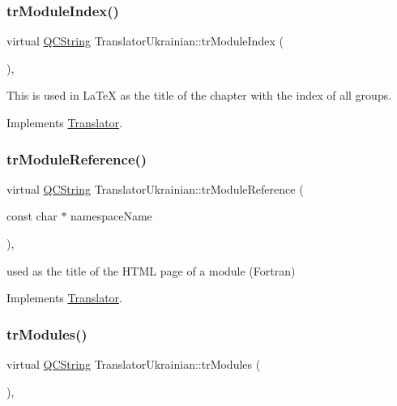 \subsubsection{\texorpdfstring{trModuleIndex()}{trModuleIndex()}}
{\footnotesize\ttfamily virtual \mbox{\hyperlink{class_q_c_string}{Q\+C\+String}} Translator\+Ukrainian\+::tr\+Module\+Index (\begin{DoxyParamCaption}{ }\end{DoxyParamCaption})\hspace{0.3cm}{\ttfamily [inline]}, {\ttfamily [virtual]}}

This is used in La\+TeX as the title of the chapter with the index of all groups. 

Implements \mbox{\hyperlink{class_translator}{Translator}}.

\mbox{\label{class_translator_ukrainian_aa126a91776fc5b2225c6261bcfffa1d3}} 
\subsubsection{\texorpdfstring{trModuleReference()}{trModuleReference()}}
{\footnotesize\ttfamily virtual \mbox{\hyperlink{class_q_c_string}{Q\+C\+String}} Translator\+Ukrainian\+::tr\+Module\+Reference (\begin{DoxyParamCaption}\item[{const char $\ast$}]{namespace\+Name }\end{DoxyParamCaption})\hspace{0.3cm}{\ttfamily [inline]}, {\ttfamily [virtual]}}

used as the title of the H\+T\+ML page of a module (Fortran) 

Implements \mbox{\hyperlink{class_translator}{Translator}}.

\mbox{\label{class_translator_ukrainian_a462e2f97dddfeda8283346d9b0f55523}} 
\subsubsection{\texorpdfstring{trModules()}{trModules()}}
{\footnotesize\ttfamily virtual \mbox{\hyperlink{class_q_c_string}{Q\+C\+String}} Translator\+Ukrainian\+::tr\+Modules (\begin{DoxyParamCaption}{ }\end{DoxyParamCaption})\hspace{0.3cm}{\ttfamily [inline]}, {\ttfamily [virtual]}}

